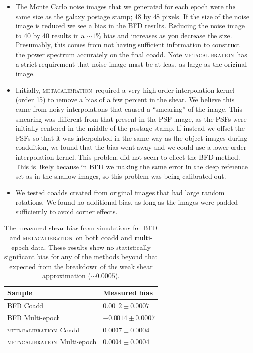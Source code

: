 \documentclass[fleqn,useAMS,usenatbib]{mnras}
\newcommand{\mcal}{\textsc{metacalibration}}
\begin{document}
\begin{itemize}

\item The Monte Carlo noise images that we generated for each epoch were the
same size as the galaxy postage stamp; 48 by 48 pixels.  If the size of the
noise image is reduced we see a bias in the BFD results.  Reducing the noise
image to 40 by 40 results in a $\sim 1\%$ bias and increases as you decrease
the size.  Presumably, this comes from not having sufficient information to
construct the power spectrum accurately on the final coadd.  Note \mcal\
has a strict requirement that noise image must be at least as large as the
original image.

\item Initially, \mcal\ required a very high order interpolation kernel (order
15) to remove a bias of a few percent in the shear.  We believe this came from
noisy interpolations that caused a ``smearing'' of the image.  This smearing
was different from that present in the PSF image, as the PSFs were initially
centered in the middle of the postage stamp.  If instead we offset the PSFs so
that it was interpolated in the same way as the object images during
coaddition, we found that the bias went away and we could use a lower order
interpolation kernel.  This problem did not seem to effect the BFD method.
This is likely because in BFD we making the same error in the deep reference
set as in the shallow images, so this problem was being calibrated out.

\item We tested coadds created from original images that had large random
rotations.  We found no additional bias, as long as the images were padded
sufficiently to avoid corner effects.

\end{itemize}

\begin{table}
\begin{tabular}{ll}
\hline
Sample & Measured bias \\ \hline
BFD Coadd & $0.0012 \pm 0.0007$ \\
BFD Multi-epoch & $-0.0014 \pm 0.0007$ \\
\mcal\ Coadd & $0.0007 \pm 0.0004$  \\
\mcal\ Multi-epoch & $0.0004 \pm 0.0004$  \\ \hline
\end{tabular}
\caption{The measured shear bias from simulations for BFD and \mcal\ on both 
coadd and multi-epoch data.  These results show no statistically significant 
bias for any of the methods beyond that expected from the breakdown
of the weak shear approximation ($\sim 0.0005$).}
\label{tab:results}
\end{table}
\end{document}
